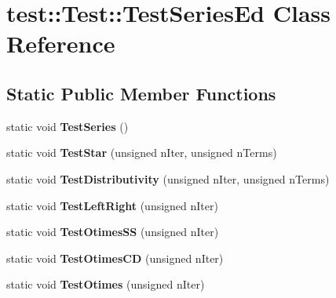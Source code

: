 \hypertarget{classtest_1_1_test_1_1_test_series_ed}{}\section{test\+:\+:Test\+:\+:Test\+Series\+Ed Class Reference}
\label{classtest_1_1_test_1_1_test_series_ed}
\subsection*{Static Public Member Functions}
\begin{DoxyCompactItemize}
\item 
\mbox{\label{classtest_1_1_test_1_1_test_series_ed_a74398c75852db8f35faf9e71c57c441c}} 
static void {\bfseries Test\+Series} ()
\item 
\mbox{\label{classtest_1_1_test_1_1_test_series_ed_ac85e1dfa10ca74a6ba06948765caee4b}} 
static void {\bfseries Test\+Star} (unsigned n\+Iter, unsigned n\+Terms)
\item 
\mbox{\label{classtest_1_1_test_1_1_test_series_ed_aeebda1f2c5ab66762952373bbd1272d7}} 
static void {\bfseries Test\+Distributivity} (unsigned n\+Iter, unsigned n\+Terms)
\item 
\mbox{\label{classtest_1_1_test_1_1_test_series_ed_a9862ad9bdc3a5e316333e01e749638d4}} 
static void {\bfseries Test\+Left\+Right} (unsigned n\+Iter)
\item 
\mbox{\label{classtest_1_1_test_1_1_test_series_ed_a939db71ae3fab6b8bd3f4f514d18161c}} 
static void {\bfseries Test\+Otimes\+SS} (unsigned n\+Iter)
\item 
\mbox{\label{classtest_1_1_test_1_1_test_series_ed_a24bcc00fdbabeeb54aee6390a81c92f0}} 
static void {\bfseries Test\+Otimes\+CD} (unsigned n\+Iter)
\item 
\mbox{\label{classtest_1_1_test_1_1_test_series_ed_aaa8ae65b484e0d62be25804b514e39e1}} 
static void {\bfseries Test\+Otimes} (unsigned n\+Iter)

\end{DoxyCompactItemize}
